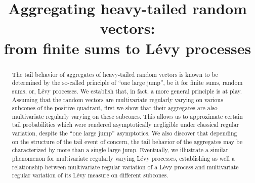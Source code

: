 \documentclass[aos]{imsart}
\numberwithin{equation}{section}
\theoremstyle{plain} %
\theoremstyle{remark}
\begin{document}
\begin{frontmatter}
\title{Aggregating heavy-tailed random vectors:\\ from finite sums to L\'evy processes}




\begin{abstract}
The tail behavior of aggregates of heavy-tailed random vectors is known to be determined by the so-called principle of ``one large jump'', be it for finite sums, random sums, or, L\'evy processes. We establish that, in fact, a more general principle is at play. Assuming that the random vectors are  {multivariate} regularly   varying on various subcones of the positive quadrant, first we show that their  aggregates are also {multivariate} regularly varying on these subcones. This allows us to approximate certain tail probabilities  which were rendered asymptotically negligible under classical regular variation, despite the  ``one large jump'' asymptotics.  We also discover that depending on the structure of the tail event of concern, the tail behavior of the aggregates may be characterized by {more than a single large jump}.  Eventually, we illustrate a similar phenomenon for multivariate regularly varying L\'evy processes, establishing as well a relationship between   multivariate regular variation of a L\'evy process and multivariate regular variation of its L\'evy measure on different subcones.




\end{abstract}
\end{frontmatter}
\end{document}
